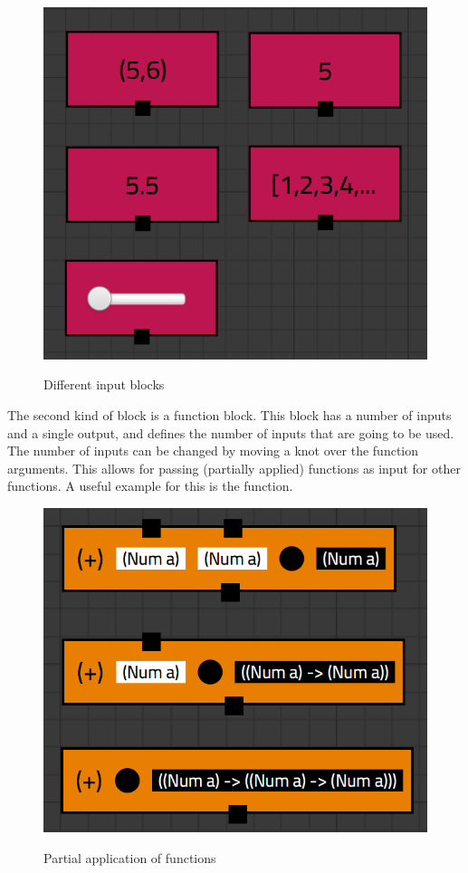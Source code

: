 \begin{figure}[p]
	\centering
	\includegraphics[scale=0.5]{Images/blocks-inputs}
	\label{fig:blocks-inputs}
	\caption{Different input blocks}
\end{figure}

The second kind of block is a function block. This block has a number of inputs and a single output, and defines the number of inputs that are going to be used. 
The number of inputs can be changed by moving a knot over the function arguments.
This allows for passing (partially applied) functions as input for other functions. 
A useful example for this is the  function.

\begin{figure}[p]
	\centering
	\includegraphics[scale=0.5]{Images/blocks-bowties}
	\label{fig:blocks-bowties}
	\caption{Partial application of functions}
\end{figure}

